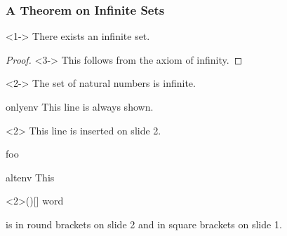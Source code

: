 \documentclass{beamer}
\begin{document}
\begin{frame}
  \frametitle{A Theorem on Infinite Sets}

  \begin{theorem}<1->
    There exists an infinite set.
  \end{theorem}

  \begin{proof}<3->
    This follows from the axiom of infinity.
  \end{proof}

  \begin{example}<2->
    The set of natural numbers is infinite.
  \end{example}
\end{frame}


\begin{frame}{onlyenv}
  This line is always shown.
  \begin{onlyenv}<2>
    This line is inserted on slide 2.
  \end{onlyenv}
  foo
\end{frame}

\begin{frame}{altenv}
  This
  \begin{altenv}<2>{(}{)}{[}{]}
    word
  \end{altenv}
  is in round brackets on slide 2 and in square brackets on slide 1.
\end{frame}
\end{document}
